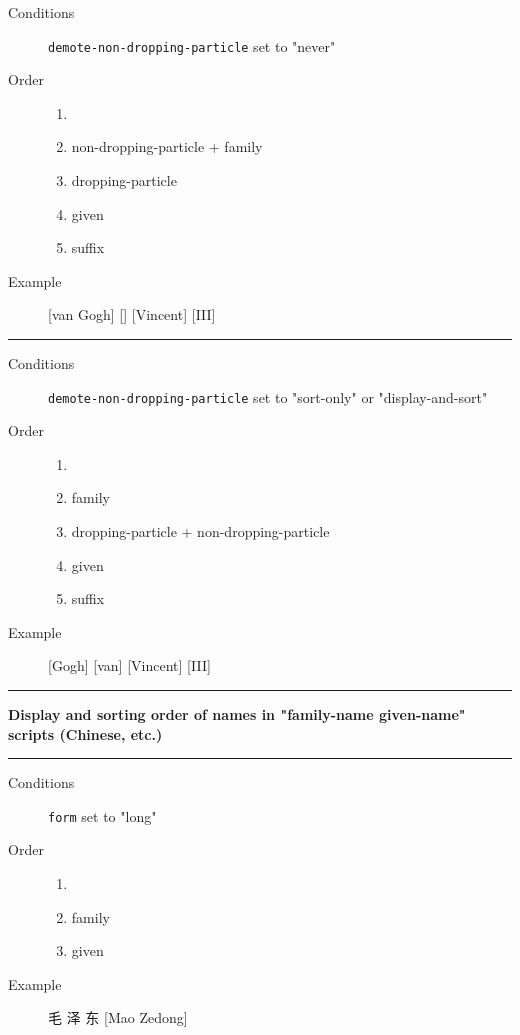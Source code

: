 \begin{description}
\item[Conditions]
\texttt{demote-non-dropping-particle} set to "never"
\item[Order]
\begin{enumerate}
\def\labelenumi{\arabic{enumi})}
\tightlist
\item[]
\item
  non-dropping-particle + family
\item
  dropping-particle
\item
  given
\item
  suffix
\end{enumerate}
\item[Example]
{[}van Gogh{]} {[}{]} {[}Vincent{]} {[}III{]}
\end{description}

\begin{center}\rule{0.5\linewidth}{0.5pt}\end{center}

\begin{description}
\item[Conditions]
\texttt{demote-non-dropping-particle} set to "sort-only" or
"display-and-sort"
\item[Order]
\begin{enumerate}
\def\labelenumi{\arabic{enumi})}
\tightlist
\item[]
\item
  family
\item
  dropping-particle + non-dropping-particle
\item
  given
\item
  suffix
\end{enumerate}
\item[Example]
{[}Gogh{]} {[}van{]} {[}Vincent{]} {[}III{]}
\end{description}

\begin{center}\rule{0.5\linewidth}{0.5pt}\end{center}

\textbf{Display and sorting order of names in "family-name given-name"
scripts (Chinese, etc.)}

\begin{center}\rule{0.5\linewidth}{0.5pt}\end{center}

\begin{description}
\item[Conditions]
\texttt{form} set to "long"
\item[Order]
\begin{enumerate}
\def\labelenumi{\arabic{enumi})}
\tightlist
\item[]
\item
  family
\item
  given
\end{enumerate}
\item[Example]
毛 泽 东 {[}Mao Zedong{]}
\end{description}


